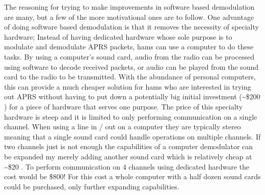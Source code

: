 The reasoning for trying to make improvements in software based demodulation are many, but a few of the more motivational ones are to follow. One advantage of doing software based demodulation is that it removes the necessity of specialty hardware; Instead of having dedicated hardware whose sole purpose is to modulate and demodulate APRS packets, hams can use a computer to do these tasks. By using a computer's sound card, audio from the radio can be processed using software to decode received packets, or audio can be played from the sound card to the radio to be transmitted. With the abundance of personal computers, this can provide a much cheaper solution for hams who are interested in trying out APRS without having to put down a potentially big initial investment (\textasciitilde\$200 \cite{Kantronics2014,Outlet2014}) for a piece of hardware that serves one purpose. The price of this specialty hardware is steep and it is limited to only performing communication on a single channel. When using a line in / out on a computer they are typically stereo meaning that a single sound card could handle operations on multiple channels. If two channels just is not enough the capabilities of a computer demodulator can be expanded my merely adding another sound card which is relatively cheap at \textasciitilde\$20 \cite{Newegg}. To perform communication on 4 channels using dedicated hardware the cost would be \$800! For this cost a whole computer with a half dozen sound cards could be purchased, only further expanding capabilities.


